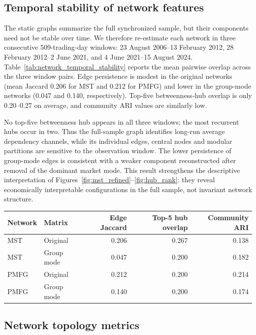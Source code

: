 \subsection{Temporal stability of network features}

The static graphs summarize the full synchronized sample, but their components need not be stable over time. We therefore re-estimate each network in three consecutive 509-trading-day windows: 23 August 2006--13 February 2012, 28 February 2012--2 June 2021, and 4 June 2021--15 August 2024. Table~\ref{tab:network_temporal_stability} reports the mean pairwise overlap across the three window pairs. Edge persistence is modest in the original networks (mean Jaccard 0.206 for MST and 0.212 for PMFG) and lower in the group-mode networks (0.047 and 0.140, respectively). Top-five betweenness-hub overlap is only 0.20--0.27 on average, and community ARI values are similarly low.

No top-five betweenness hub appears in all three windows; the most recurrent hubs occur in two. Thus the full-sample graph identifies long-run average dependency channels, while its individual edges, central nodes and modular partitions are sensitive to the observation window. The lower persistence of group-mode edges is consistent with a weaker component reconstructed after removal of the dominant market mode. This result strengthens the descriptive interpretation of Figures~\ref{fig:mst_refined}--\ref{fig:hub_rank}: they reveal economically interpretable configurations in the full sample, not invariant network structure.

\begin{center}
\label{tab:network_temporal_stability}
\begin{tabular}{llrrr}
\toprule
Network & Matrix & Edge Jaccard & Top-5 hub overlap & Community ARI \\
\midrule
MST & Original & 0.206 & 0.267 & 0.138 \\
MST & Group mode & 0.047 & 0.200 & 0.182 \\
PMFG & Original & 0.212 & 0.200 & 0.214 \\
PMFG & Group mode & 0.140 & 0.200 & 0.174 \\
\bottomrule
\end{tabular}
\end{center}
\GlobalPrecisionNote


\subsection{Network topology metrics}

